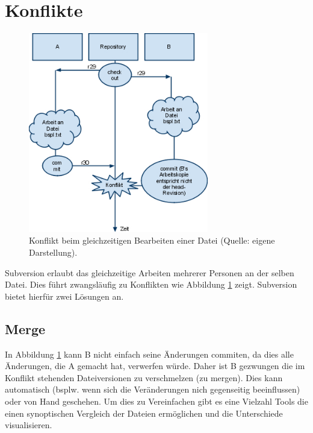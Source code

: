 \section{Konflikte}
\begin{figure}[!htb]
\centering
\includegraphics[width=0.7\textwidth]{konflikt}
\caption{Konflikt beim gleichzeitigen Bearbeiten einer Datei (Quelle: eigene Darstellung).}
\label{fig:konflikt}
\end{figure}
Subversion erlaubt das gleichzeitige Arbeiten mehrerer Personen an der selben Datei. Dies führt zwangsläufig zu Konflikten wie Abbildung \ref{fig:konflikt} zeigt. Subversion bietet hierfür zwei Lösungen an.
\subsection{Merge}
In Abbildung \ref{fig:konflikt} kann B nicht einfach seine Änderungen commiten, da dies alle Änderungen, die A gemacht hat, verwerfen würde. Daher ist B gezwungen die im Konflikt stehenden Dateiversionen zu verschmelzen (zu mergen). Dies kann automatisch (bsplw. wenn sich die Veränderungen nich gegenseitig beeinflussen) oder von Hand geschehen. Um dies zu Vereinfachen gibt es eine Vielzahl Tools die einen synoptischen Vergleich der Dateien ermöglichen und die Unterschiede visualisieren.

